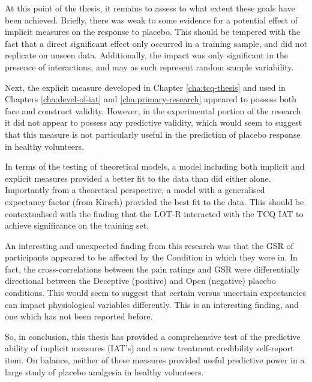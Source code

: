 At this point of the thesis, it remains to assess to what extent these goals have been achieved. Briefly, there was weak to some evidence for a potential effect of implicit measures on the response to placebo. This should be tempered with the fact that a direct significant effect only occurred in a training sample, and did not replicate on unseen data. Additionally, the impact was only significant in the presence of interactions, and may as such represent random sample variability. 

Next, the explicit measure developed in Chapter \ref{cha:tcq-thesis} and used in Chapters \ref{cha:devel-of-iat} and \ref{cha:primary-research} appeared to possess both face and construct validity. However, in the experimental portion of the research it did not appear to possess any predictive validity, which would seem to suggest that this measure is not particularly useful in the prediction of placebo response in healthy volunteers. 

In terms of the testing of theoretical models, a model including both implicit and explicit measures provided a better fit to the data than did either alone. Importantly from a theoretical perspective, a model with a generalised expectancy factor (from Kirsch) provided the best fit to the data. This should be contextualised with the finding that the LOT-R interacted with the TCQ IAT to achieve significance on the training set.

An interesting and unexpected finding from this research was that the GSR of participants appeared to be affected by the Condition in which they were in. In fact, the cross-correlations between the pain ratings and GSR were differentially directional between the Deceptive (positive) and Open (negative) placebo conditions. This would seem to suggest that certain versus uncertain expectancies can impact physiological variables differently. This is an interesting finding, and one which has not been reported before. 

So, in conclusion, this thesis has provided a comprehensive test of the predictive ability of implicit measures (IAT's) and a new treatment credibility self-report item. On balance, neither of these measures provided useful predictive power in a large study of placebo analgesia in healthy volunteers. 

